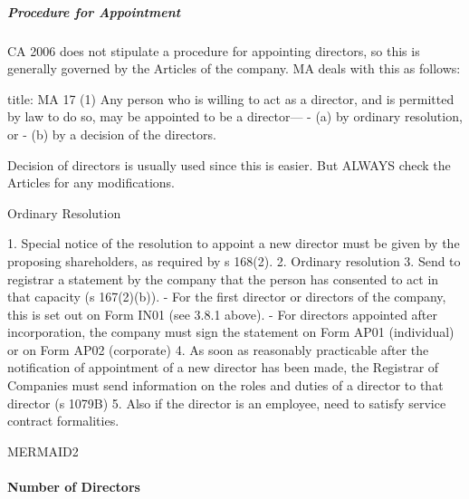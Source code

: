 \documentclass[
]{article}
\newenvironment{Shaded}{}{}
\newcommand{\NormalTok}[1]{#1}
\begin{document}
\hypertarget{procedure-for-appointment}{%
\subparagraph{Procedure for
Appointment}\label{procedure-for-appointment}}

CA 2006 does not stipulate a procedure for appointing directors, so this
is generally governed by the Articles of the company. MA deals with this
as follows:

\begin{Shaded}
\begin{Highlighting}[]
\NormalTok{title: MA 17}
\NormalTok{(1) Any person who is willing to act as a director, and is permitted by law to do so, may be appointed to be a director—}
\NormalTok{{-} (a) by ordinary resolution, or}
\NormalTok{{-} (b) by a decision of the directors.}
\end{Highlighting}
\end{Shaded}

Decision of directors is usually used since this is easier. But ALWAYS
check the Articles for any modifications.

Ordinary Resolution

\begin{Shaded}
\begin{Highlighting}[]
\NormalTok{1. Special notice of the resolution to appoint a new director must be given by the proposing shareholders, as required by s 168(2).}
\NormalTok{2. Ordinary resolution}
\NormalTok{3. Send to registrar a statement by the company that the person has consented to act in that capacity (s 167(2)(b)).}
\NormalTok{    {-} For the first director or directors of the company, this is set out on Form IN01 (see 3.8.1 above). }
\NormalTok{    {-} For directors appointed after incorporation, the company must sign the statement on Form AP01 (individual) or on Form AP02 (corporate)}
\NormalTok{4. As soon as reasonably practicable after the notification of appointment of a new director has been made, the Registrar of Companies must send information on the roles and duties of a director to that director (s 1079B)}
\NormalTok{5. Also if the director is an employee, need to satisfy service contract formalities. }
\end{Highlighting}
\end{Shaded}

MERMAID2

\hypertarget{number-of-directors}{%
\paragraph{Number of Directors}\label{number-of-directors}}
\end{document}
